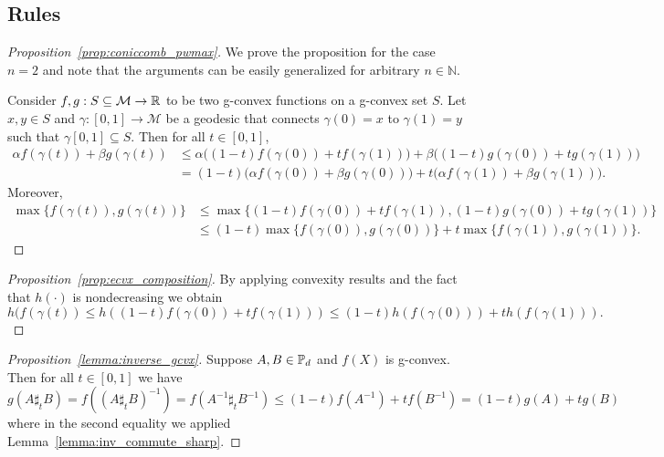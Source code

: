 \documentclass[twoside,11pt]{article}
\begin{document}
\subsection{Rules}\label{app:gcvx_rules}
\begin{proof}[Proposition~\ref{prop:coniccomb_pwmax}]

We prove the proposition for the case $n=2$ and note that the arguments can be easily generalized for arbitrary $n \in \mathbb{N}$. 

Consider $f,g: S \subseteq \mathcal{M} \to \mathbb{R}$ to be two g-convex functions on a g-convex set $S$. Let $x,y \in S$ and $\gamma:[0,1] \to \mathcal{M}$ be a geodesic that connects $\gamma(0) = x$ to $\gamma(1) = y$ such that $\gamma[0,1] \subseteq S$. Then for all $t \in [0,1]$,
\begin{align*}
    \alpha f(\gamma(t)) + \beta g(\gamma(t)) &\leq \alpha \bigg( (1-t)f(\gamma(0)) + t f(\gamma(1))\bigg) + \beta \bigg( (1-t)g(\gamma(0)) + t g(\gamma(1))\bigg)
    \\&= \left(1-t\right)\big(\alpha f(\gamma(0)) + \beta g(\gamma(0)) \big) + t \big(\alpha f(\gamma(1)) + \beta g(\gamma(1))\big).
\end{align*}
Moreover, 
\begin{align*}
    \max \big\{f(\gamma(t)), g(\gamma(t)) \big\} & \leq \max \big\{(1-t)f(\gamma(0)) + t f(\gamma(1)), (1-t)g(\gamma(0)) + t g(\gamma(1))  \big\}
    \\&\leq (1-t) \max\big \{f(\gamma(0)),g(\gamma(0))  \big\} + t \max\big\{f(\gamma(1)), g(\gamma(1))\big \}.
\end{align*}
\end{proof}

\begin{proof}[Proposition~\ref{prop:ecvx_composition}]
By applying convexity results and the fact that $h(\cdot)$ is nondecreasing we obtain
\[
h(f(\gamma(t)) \leq h \left((1-t)f(\gamma(0)) + t f(\gamma(1))\right) \leq (1-t)h(f(\gamma(0))) + t h(f(\gamma(1))).
\]
\end{proof}


\begin{proof}[Proposition~\ref{lemma:inverse_gcvx}]
    Suppose $A, B \in \mathbb{P}_d$ and $f(X)$ is g-convex. Then for all $t \in [0,1]$ we have 
    \[
    g(A \sharp_t B) = f\left( (A \sharp_t B)^{-1}\right) = f(A^{-1} \sharp_t B^{-1}) \leq \left(1-t\right)f\left(A^{-1}\right) + t f\left(B^{-1}\right) = (1-t)g(A) + tg(B)
    \]
    where in the second equality we applied Lemma~\ref{lemma:inv_commute_sharp}.
    
\end{proof}
\end{document}
